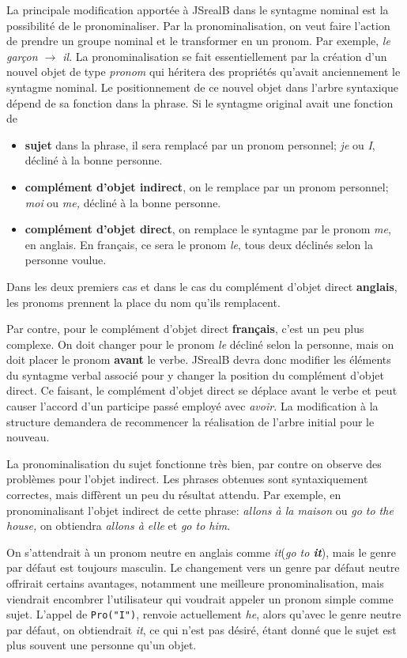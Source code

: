 \documentclass[11pt]{article} %
\newcommand{\system}[1]{\textsf{#1}}
\newcommand{\JSB}{\system{JSrealB}}
\begin{document}
La principale modification apportée à \JSB{} dans le syntagme nominal
est la possibilité de le pronominaliser. Par la pronominalisation,
on veut faire l'action de prendre un groupe nominal et le transformer
en un pronom. Par exemple, \emph{le garçon $\rightarrow$ il}. La
pronominalisation se fait essentiellement par la création d'un nouvel
objet de type \emph{pronom} qui héritera des propriétés qu'avait anciennement
le syntagme nominal. Le positionnement de ce nouvel objet
dans l'arbre syntaxique dépend de sa fonction dans la phrase. Si le syntagme
original avait une fonction de
\begin{itemize}
\item \textbf{sujet} dans la phrase, il sera remplacé par un pronom 
personnel; \emph{je }ou \emph{I}, décliné à la bonne personne.
\item \textbf{complément d'objet indirect}, on le remplace par un pronom
personnel; \emph{moi }ou \emph{me, }décliné à la bonne personne.
\item \textbf{complément d'objet
direct}, on remplace le syntagme par le pronom \emph{me}, en anglais. En français,
ce sera le pronom \emph{le}, tous deux déclinés selon la personne voulue.
\end{itemize}
Dans les deux premiers cas et dans le cas du complément d'objet direct \textbf{anglais},
les pronoms prennent la place du nom qu'ils remplacent.

Par contre, pour le complément d'objet direct \textbf{français}, c'est un peu plus complexe.
On doit changer pour le pronom \emph{le}
décliné selon la personne, mais on doit placer le pronom \textbf{avant} le
verbe. \JSB{} devra donc modifier les éléments du syntagme verbal
associé pour y changer la position du complément d'objet direct. Ce
faisant, le complément d'objet direct se déplace avant le verbe et
peut causer l'accord d'un participe passé employé avec \emph{avoir.
}La modification à la structure demandera de recommencer la réalisation
de l'arbre initial pour le nouveau.

La pronominalisation
du sujet fonctionne très bien, par contre on observe
des problèmes pour l'objet indirect. Les phrases obtenues sont
syntaxiquement correctes, mais diffèrent un peu du résultat attendu.
Par exemple, en pronominalisant l'objet indirect de cette phrase:
\emph{allons à la maison} ou \emph{go to the house, }on obtiendra
\emph{allons à elle }et \emph{go to him}. 

On s'attendrait à un pronom\emph{
}neutre en anglais comme \emph{it}(\emph{go to \textbf{it}}), mais le genre par défaut est toujours
masculin. Le changement vers un genre par défaut neutre offrirait certains avantages, 
notamment une meilleure pronominalisation, mais viendrait encombrer l'utilisateur
qui voudrait appeler un pronom simple comme sujet. L'appel de \texttt{Pro("I")}, renvoie 
actuellement \emph{he}, alors qu'avec le genre neutre par défaut, on obtiendrait \emph{it},
ce qui n'est pas désiré, étant donné que le sujet est plus souvent une personne qu'un objet.
\end{document}

